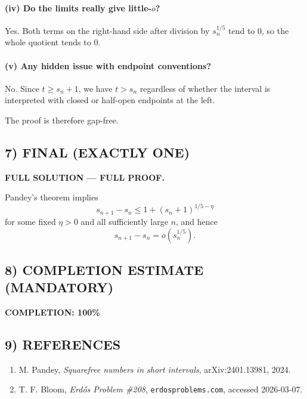 \paragraph{(iv) Do the limits really give little-$o$?}
Yes. Both terms on the right-hand side after division by $s_n^{1/5}$ tend to $0$, so the whole quotient tends to $0$.

\paragraph{(v) Any hidden issue with endpoint conventions?}
No. Since $t\ge s_n+1$, we have $t>s_n$ regardless of whether the interval is interpreted with closed or half-open endpoints at the left.

The proof is therefore gap-free.

\subsection*{7) FINAL (EXACTLY ONE)}

\textbf{FULL SOLUTION --- FULL PROOF.}

Pandey's theorem implies
\[
s_{n+1}-s_n\le 1+(s_n+1)^{1/5-\eta}
\]
for some fixed $\eta>0$ and all sufficiently large $n$, and hence
\[
s_{n+1}-s_n=o(s_n^{1/5}).
\]

\subsection*{8) COMPLETION ESTIMATE (MANDATORY)}

\textbf{COMPLETION: 100\%}

\subsection*{9) REFERENCES}

\begin{enumerate}
\item M. Pandey, \emph{Squarefree numbers in short intervals}, arXiv:2401.13981, 2024.
\item T. F. Bloom, \emph{Erd\H{o}s Problem \#208}, \texttt{erdosproblems.com}, accessed 2026-03-07.
\end{enumerate}

